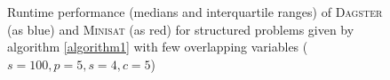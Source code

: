 \begin{figure}[]
		\caption[Runtime performance for random structured problems with few overlapping variables]{Runtime performance (medians and interquartile ranges) of \textsc{Dagster} (as blue) and \textsc{Minisat} (as red) for structured problems given by algorithm \ref{algorithm1} with few overlapping variables ($s=100,p=5,s=4,c=5$)}
		\label{fig:performance_graph1}
    \end{figure}
